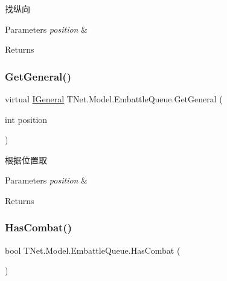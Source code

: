 找纵向 


\begin{DoxyParams}{Parameters}
{\em position} & \\
\hline
\end{DoxyParams}
\begin{DoxyReturn}{Returns}

\end{DoxyReturn}
\mbox{\label{class_t_net_1_1_model_1_1_embattle_queue_adfd1564b437f4b7b5338244f8e3655de}} 
\subsubsection{\texorpdfstring{Get\+General()}{GetGeneral()}}
{\footnotesize\ttfamily virtual \mbox{\hyperlink{interface_t_net_1_1_model_1_1_i_general}{I\+General}} T\+Net.\+Model.\+Embattle\+Queue.\+Get\+General (\begin{DoxyParamCaption}\item[{int}]{position }\end{DoxyParamCaption})\hspace{0.3cm}{\ttfamily [virtual]}}



根据位置取 


\begin{DoxyParams}{Parameters}
{\em position} & \\
\hline
\end{DoxyParams}
\begin{DoxyReturn}{Returns}

\end{DoxyReturn}
\mbox{\label{class_t_net_1_1_model_1_1_embattle_queue_a151f22a8eccfe84fd102fb37329605f7}} 
\subsubsection{\texorpdfstring{Has\+Combat()}{HasCombat()}}
{\footnotesize\ttfamily bool T\+Net.\+Model.\+Embattle\+Queue.\+Has\+Combat (\begin{DoxyParamCaption}{ }\end{DoxyParamCaption})}



